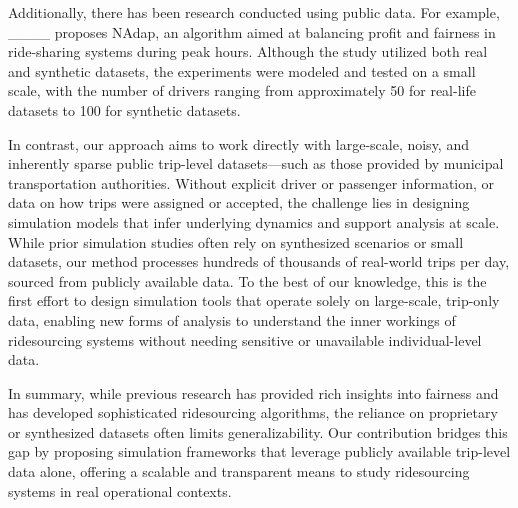 Additionally, there has been research conducted using public data. For example, ____ proposes NAdap, an algorithm aimed at balancing profit and fairness in ride-sharing systems during peak hours. Although the study utilized both real and synthetic datasets, the experiments were modeled and tested on a small scale, with the number of drivers ranging from approximately 50 for real-life datasets to 100 for synthetic datasets.

In contrast, our approach aims to work directly with large-scale, noisy, and inherently sparse public trip-level datasets—such as those provided by municipal transportation authorities. Without explicit driver or passenger information, or data on how trips were assigned or accepted, the challenge lies in designing simulation models that infer underlying dynamics and support analysis at scale. While prior simulation studies often rely on synthesized scenarios or small datasets, our method processes hundreds of thousands of real-world trips per day, sourced from publicly available data. To the best of our knowledge, this is the first effort to design simulation tools that operate solely on large-scale, trip-only data, enabling new forms of analysis to understand the inner workings of ridesourcing systems without needing sensitive or unavailable individual-level data.

In summary, while previous research has provided rich insights into fairness and has developed sophisticated ridesourcing algorithms, the reliance on proprietary or synthesized datasets often limits generalizability. Our contribution bridges this gap by proposing simulation frameworks that leverage publicly available trip-level data alone, offering a scalable and transparent means to study ridesourcing systems in real operational contexts.